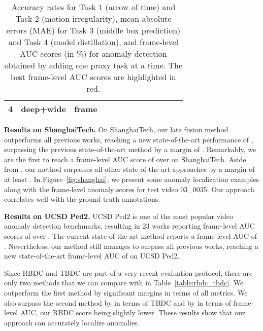 \documentclass[final]{cvpr}
\begin{document}
\begin{table*}[t]
{\begin{center}
\begin{tabular}{|c|l|l|c|c|c|c|c|c|c|c|c|c|}
\hline
4 & deep+wide      & frame &  &  &  &  &  &  &  &  &  &   \\
\hline
\end{tabular}
\end{center}
}
\vspace*{-0.2cm}
\caption{Accuracy rates for Task 1 (arrow of time) and Task 2 (motion irregularity), mean absolute errors (MAE) for Task 3 (middle box prediction) and Task 4 (model distillation), and frame-level AUC scores (in \%) for anomaly detection obtained by adding one proxy task at a time. The best frame-level AUC scores are highlighted in red.\label{table:ablation}} 
\vspace*{-0.3cm}
\end{table*}

\noindent
{\bf Results on ShanghaiTech.}
On ShanghaiTech, our late fusion method outperforms all previous works, reaching a new state-of-the-art performance of , surpassing the previous state-of-the-art method \cite{Ionescu-CVPR-2019} by a margin of . Remarkably, we are the first to reach a frame-level AUC score of over  on ShanghaiTech. Aside from \cite{Ionescu-CVPR-2019}, our method surpasses all other state-of-the-art approaches by a margin of at least .
In Figure~\ref{fig:shanghai}, we present some anomaly localization examples along with the frame-level anomaly scores for test video 03{\_}0035. Our approach correlates well with the ground-truth annotations.

\noindent
{\bf Results on UCSD Ped2.}
UCSD Ped2 is one of the most popular video anomaly detection benchmarks, resulting in 23 works reporting frame-level AUC scores of over . The current state-of-the-art method \cite{Vu-AAAI-2019} reports a frame-level AUC of . Nevertheless, our method still manages to surpass all previous works, reaching a new state-of-the-art frame-level AUC of  on UCSD Ped2.

Since RBDC and TBDC are part of a very recent evaluation protocol, there are only two methods \cite{Ramachandra-WACV-2020a,Ramachandra-WACV-2020b} that we can compare with in Table~\ref{table:rbdc_tbdc}. We outperform the first method \cite{Ramachandra-WACV-2020a} by significant margins in terms of all metrics. We also surpass the second method by  in terms of TBDC and by  in terms of frame-level AUC, our RBDC score being slightly lower. These results show that our approach can accurately localize anomalies.



\vspace*{-0.1cm}
\end{document}
